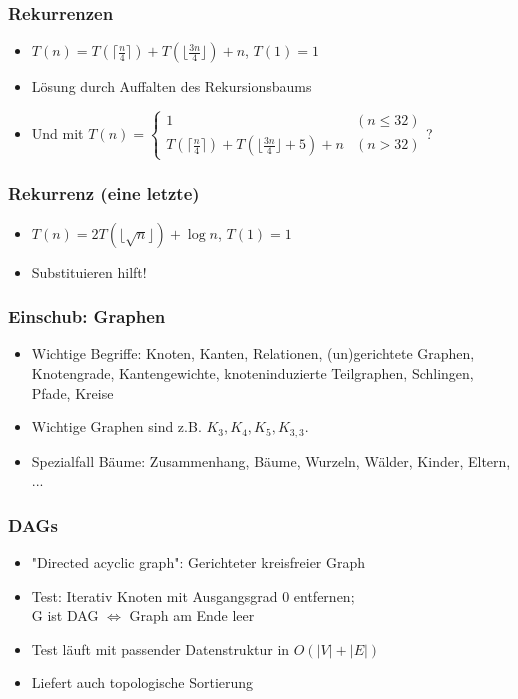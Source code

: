 \begin{frame}
\frametitle{Rekurrenzen}
\begin{itemize}
\item $T(n) = T(\lceil \frac{n}{4}\rceil)+T(\lfloor\frac{3n}{4}\rfloor)+n$, $T(1)=1$
\item Lösung durch Auffalten des Rekursionsbaums\pause
\item Und mit $T(n) = \begin{cases}1 & (n\leq 32) \\
T(\lceil \frac{n}{4}\rceil)+T(\lfloor\frac{3n}{4}\rfloor+5)+n & (n>32)\end{cases}${\Huge ?}
\end{itemize}
\end{frame}

\begin{frame}
\frametitle{Rekurrenz (eine letzte)}
\begin{itemize}
\item $T(n) = 2T(\lfloor\sqrt{n}\rfloor)+\log n$, $T(1)=1$\pause
\item Substituieren hilft!
\end{itemize}
\end{frame}

\begin{frame}
\frametitle{Einschub: Graphen}
\begin{itemize}
\item Wichtige Begriffe: Knoten, Kanten, Relationen, (un)gerichtete Graphen, Knotengrade, Kantengewichte, knoteninduzierte Teilgraphen, Schlingen, Pfade, Kreise\pause
\item Wichtige Graphen sind z.B. $K_3, K_4, K_5, K_{3,3}$.\pause
\item Spezialfall Bäume: Zusammenhang, Bäume, Wurzeln, Wälder, Kinder, Eltern, ...
\end{itemize}
\end{frame}

\begin{frame}
\frametitle{DAGs}
\begin{itemize}
\item "Directed acyclic graph": Gerichteter kreisfreier Graph
\item Test: Iterativ Knoten mit Ausgangsgrad 0 entfernen; \\ G ist DAG $\Leftrightarrow$ Graph am Ende leer
\item Test läuft mit passender Datenstruktur in $O(|V|+|E|)$
\item Liefert auch topologische Sortierung
\end{itemize}
\end{frame}

